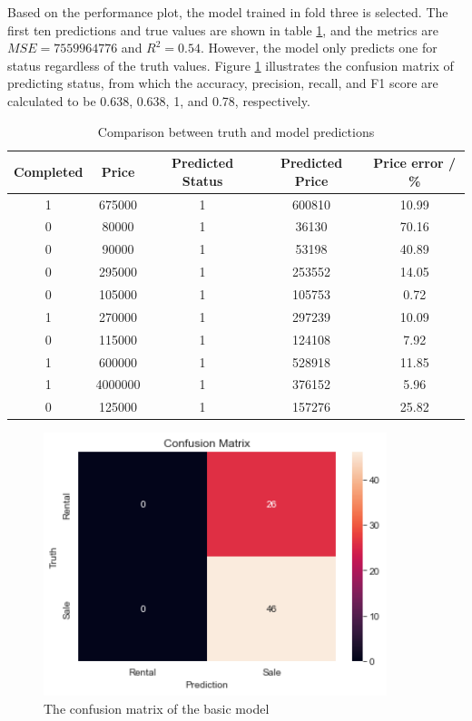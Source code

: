 \documentclass[12pt,twoside]{report}
\begin{document}
Based on the performance plot, the model trained in fold three is selected. The first ten predictions and true values are shown in table \ref{first_model_predictions}, and the metrics are $MSE = 7559964776$ and $R^2 = 0.54$. However, the model only predicts one for status regardless of the truth values. Figure \ref{confusion_matrix_basic_model} illustrates the confusion matrix of predicting status, from which the accuracy, precision, recall, and F1 score are calculated to be 0.638, 0.638, 1, and 0.78, respectively. 
\\

\begin{table}[h]
	\centering
	\caption{Comparison between truth and model predictions}
	\label{first_model_predictions}
	\begin{tabular}{| c | c | c | c | c |}
		\hline
		Completed & Price & Predicted Status & Predicted Price & Price error  / \%\\ 
		\hline
		1 & 675000 & 1 & 600810 & 10.99 \\
		\hline
		0 & 80000 & 1 & 36130 & 70.16 \\
		\hline
		0 & 90000 & 1 & 53198 & 40.89  \\
		\hline
		0 & 295000 & 1 & 253552 & 14.05  \\
		\hline
		0 & 105000 & 1 & 105753 & 0.72  \\ 
		\hline
		1 & 270000 & 1 & 297239 & 10.09  \\
		\hline
		0 & 115000 & 1 & 124108 & 7.92  \\
		\hline
		1 & 600000 & 1 & 528918 & 11.85  \\
		\hline
		1 & 4000000 & 1 & 376152 & 5.96  \\
		\hline
		0 & 125000 & 1 & 157276 & 25.82  \\
		\hline
	\end{tabular}
\end{table}

\begin{figure}[h]
	\centering
	\includegraphics[width=10cm]{confusion_matrix_basic_model}
	\caption{The confusion matrix of the basic model}
	\label{confusion_matrix_basic_model}
\end{figure}
\end{document}
